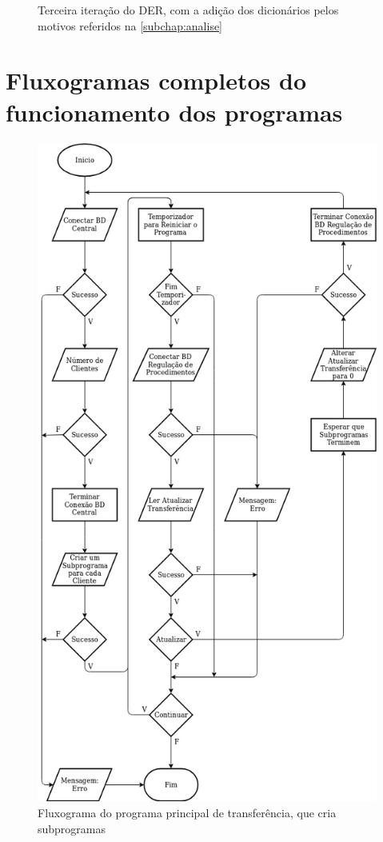 \documentclass[11pt,twoside,a4paper]{report}
\begin{document}
\begin{landscape}
\begin{figure}
\begin{center}
		\caption[Terceira iteração do Diagrama Entidade/Relação]{Terceira iteração do DER, com a adição dos dicionários pelos motivos referidos na \autoref{subchap:analise}}
		\label{fig:evolucao_der3}
	\end{center}
\end{figure}
\end{landscape}

\cleardoublepage
\chapter{Fluxogramas completos do funcionamento dos programas}
\label{apen:fluxogramas}
\begin{figure}[H]
	\vspace{-3cm}
	\begin{center}
		\includegraphics[width=.75\textwidth]{fluxograma_transferencia_programa4} %
		\caption[Fluxograma do programa principal de transferência]{Fluxograma do programa principal de transferência, que cria subprogramas}
		\label{fig:transferencia_programa}
	\end{center}
\end{figure}
\end{document}
